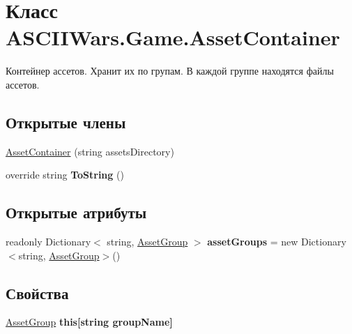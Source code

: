 \hypertarget{class_a_s_c_i_i_wars_1_1_game_1_1_asset_container}{}\section{Класс A\+S\+C\+I\+I\+Wars.\+Game.\+Asset\+Container}
\label{class_a_s_c_i_i_wars_1_1_game_1_1_asset_container}


Контейнер ассетов. Хранит их по групам. В каждой группе находятся файлы ассетов.  


\subsection*{Открытые члены}
\begin{DoxyCompactItemize}
\item 
\hyperlink{class_a_s_c_i_i_wars_1_1_game_1_1_asset_container_afb55a3f711d67504b677fc2bc38718cc}{Asset\+Container} (string assets\+Directory)
\item 
\hypertarget{class_a_s_c_i_i_wars_1_1_game_1_1_asset_container_a73cb91685f397df31d2a18d8b59b3093}{}\label{class_a_s_c_i_i_wars_1_1_game_1_1_asset_container_a73cb91685f397df31d2a18d8b59b3093} 
override string {\bfseries To\+String} ()
\end{DoxyCompactItemize}
\subsection*{Открытые атрибуты}
\begin{DoxyCompactItemize}
\item 
\hypertarget{class_a_s_c_i_i_wars_1_1_game_1_1_asset_container_afc2c4d42edc386fa6bdbf561546b2083}{}\label{class_a_s_c_i_i_wars_1_1_game_1_1_asset_container_afc2c4d42edc386fa6bdbf561546b2083} 
readonly Dictionary$<$ string, \hyperlink{class_a_s_c_i_i_wars_1_1_game_1_1_asset_group}{Asset\+Group} $>$ {\bfseries asset\+Groups} = new Dictionary$<$string, \hyperlink{class_a_s_c_i_i_wars_1_1_game_1_1_asset_group}{Asset\+Group}$>$()
\end{DoxyCompactItemize}
\subsection*{Свойства}
\begin{DoxyCompactItemize}
\item 
\hypertarget{class_a_s_c_i_i_wars_1_1_game_1_1_asset_container_ae7149eab74d76098eca27b20d49d0bf9}{}\label{class_a_s_c_i_i_wars_1_1_game_1_1_asset_container_ae7149eab74d76098eca27b20d49d0bf9} 
\hyperlink{class_a_s_c_i_i_wars_1_1_game_1_1_asset_group}{Asset\+Group} {\bfseries this\mbox{[}string group\+Name\mbox{]}}
\end{DoxyCompactItemize}


